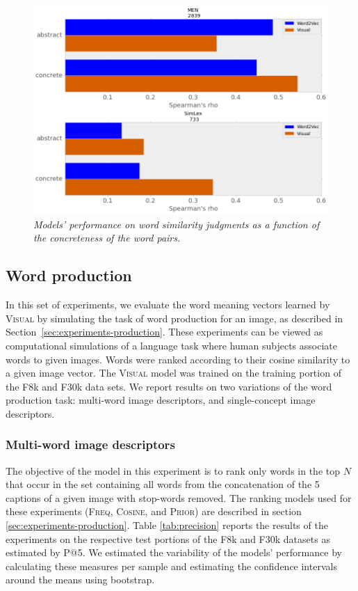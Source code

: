 \begin{figure}
\label{fig:concreteness}
\centering
\includegraphics[scale=0.3]{chapters/TAL/concreteness}
\caption{\textit{Models' performance on word similarity
judgments as a function of the concreteness of the word pairs.}}
\end{figure}


\subsection{Word production}
In this set of experiments, we evaluate the word meaning vectors learned
by \textsc{Visual} by simulating the task of word production for an image, as described in
Section~\ref{sec:experiments-production}. These experiments can be viewed as
computational simulations of a language task where human subjects
associate words to given images. Words were ranked according to their
cosine similarity to a given image vector. The \textsc{Visual} model
was trained on the training portion of the F8k and F30k data
sets. We report results on two variations of the word production task:
multi-word image descriptors, and single-concept image descriptors.

\subsubsection{Multi-word image descriptors}
\label{sec:multi-word}
The objective of the model in this experiment is to rank only words in
the top $N$ that occur in the set containing all words from the
concatenation of the 5 captions of a given image with stop-words
removed. The ranking models used for these experiments (\textsc{Freq},
\textsc{Cosine}, and \textsc{Prior}) are described in
section \ref{sec:experiments-production}. Table \ref{tab:precision}
reports the results of the experiments on the respective test portions
of the F8k and F30k datasets as estimated by P@5.
We estimated the variability of the models'
performance by calculating these measures per sample and estimating
the confidence intervals around the means using bootstrap.

